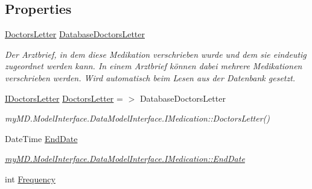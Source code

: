 \subsection*{Properties}
\begin{CompactItemize}
\item 
\hypertarget{classmy_m_d_1_1_model_1_1_data_model_1_1_medication_395ef5590aa80e0c7545cc20fae76f0d}{
\hyperlink{classmy_m_d_1_1_model_1_1_data_model_1_1_doctors_letter}{Doctors\-Letter} \hyperlink{classmy_m_d_1_1_model_1_1_data_model_1_1_medication_395ef5590aa80e0c7545cc20fae76f0d}{Database\-Doctors\-Letter}}
\label{d0/daf/classmy_m_d_1_1_model_1_1_data_model_1_1_medication_395ef5590aa80e0c7545cc20fae76f0d}

\begin{CompactList}\small\item\em Der Arztbrief, in dem diese Medikation verschrieben wurde und dem sie eindeutig zugeordnet werden kann. In einem Arztbrief k\"{o}nnen dabei mehrere Medikationen verschrieben werden. Wird automatisch beim Lesen aus der Datenbank gesetzt. \item\end{CompactList}\item 
\hypertarget{classmy_m_d_1_1_model_1_1_data_model_1_1_medication_c16d737aed0b6803d1255bb7d93aed03}{
\hyperlink{interfacemy_m_d_1_1_model_interface_1_1_data_model_interface_1_1_i_doctors_letter}{IDoctors\-Letter} \hyperlink{classmy_m_d_1_1_model_1_1_data_model_1_1_medication_c16d737aed0b6803d1255bb7d93aed03}{Doctors\-Letter} = $>$ Database\-Doctors\-Letter}
\label{d0/daf/classmy_m_d_1_1_model_1_1_data_model_1_1_medication_c16d737aed0b6803d1255bb7d93aed03}

\begin{CompactList}\small\item\em my\-MD.Model\-Interface.Data\-Model\-Interface.IMedication::Doctors\-Letter() \item\end{CompactList}\item 
\hypertarget{classmy_m_d_1_1_model_1_1_data_model_1_1_medication_a7f44c44b37e090a40ad2d76aa86d08d}{
Date\-Time \hyperlink{classmy_m_d_1_1_model_1_1_data_model_1_1_medication_a7f44c44b37e090a40ad2d76aa86d08d}{End\-Date}}
\label{d0/daf/classmy_m_d_1_1_model_1_1_data_model_1_1_medication_a7f44c44b37e090a40ad2d76aa86d08d}

\begin{CompactList}\small\item\em \hyperlink{interfacemy_m_d_1_1_model_interface_1_1_data_model_interface_1_1_i_medication_a7f44c44b37e090a40ad2d76aa86d08d}{my\-MD.Model\-Interface.Data\-Model\-Interface.IMedication::End\-Date} \item\end{CompactList}\item 
\hypertarget{classmy_m_d_1_1_model_1_1_data_model_1_1_medication_7cf395303ce3665a9834721d4b748e4b}{
int \hyperlink{classmy_m_d_1_1_model_1_1_data_model_1_1_medication_7cf395303ce3665a9834721d4b748e4b}{Frequency}}
\label{d0/daf/classmy_m_d_1_1_model_1_1_data_model_1_1_medication_7cf395303ce3665a9834721d4b748e4b}


\end{CompactItemize}
